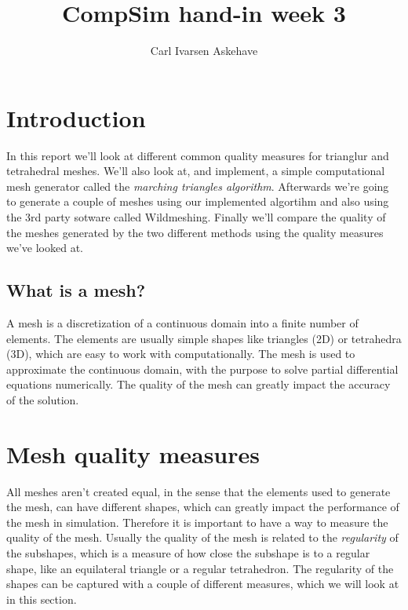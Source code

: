\documentclass[acmtog]{acmart}
\begin{document}
\title{CompSim hand-in week 3}
\author{Carl Ivarsen Askehave}

\maketitle
\thispagestyle{empty}

\section{Introduction}
In this report we'll look at different common quality measures for trianglur
and tetrahedral meshes. We'll also look at, and implement, a simple
computational mesh generator called the \emph{marching triangles algorithm}.
Afterwards we're going to generate a couple of meshes using our implemented
algortihm and also using the 3rd party sotware called Wildmeshing. Finally
we'll compare the quality of the meshes generated by the two different methods
using the quality measures we've looked at.

\subsection*{What is a mesh?}
A mesh is a discretization of a continuous domain into a finite number of
elements. The elements are usually simple shapes like triangles (2D) or
tetrahedra (3D), which are easy to work with computationally. The mesh is used
to approximate the continuous domain, with the purpose to solve partial
differential equations numerically. The quality of the mesh can greatly impact
the accuracy of the solution.

\section{Mesh quality measures}
All meshes aren't created equal, in the sense that the elements used to
generate the mesh, can have different shapes, which can greatly impact the
performance of the mesh in simulation. Therefore it is important to have a way
to measure the quality of the mesh. Usually the quality of the mesh is related
to the \textit{regularity} of the subshapes, which is a measure of how close
the subshape is to a regular shape, like an equilateral triangle or a regular
tetrahedron. The regularity of the shapes can be captured with a couple of
different measures, which we will look at in this section.
\end{document}
